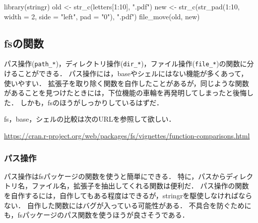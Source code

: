 \documentclass[
]{article}
\newenvironment{Shaded}{\begin{snugshade}}{\end{snugshade}}
\newcommand{\AttributeTok}[1]{\textcolor[rgb]{0.77,0.63,0.00}{#1}}
\newcommand{\DecValTok}[1]{\textcolor[rgb]{0.00,0.00,0.81}{#1}}
\newcommand{\FunctionTok}[1]{\textcolor[rgb]{0.00,0.00,0.00}{#1}}
\newcommand{\NormalTok}[1]{#1}
\newcommand{\OtherTok}[1]{\textcolor[rgb]{0.56,0.35,0.01}{#1}}
\newcommand{\SpecialCharTok}[1]{\textcolor[rgb]{0.00,0.00,0.00}{#1}}
\newcommand{\StringTok}[1]{\textcolor[rgb]{0.31,0.60,0.02}{#1}}
\begin{document}
\begin{Shaded}
\begin{Highlighting}[]
\FunctionTok{library}\NormalTok{(stringr)}
\NormalTok{old }\OtherTok{\textless{}{-}} \FunctionTok{str\_c}\NormalTok{(letters[}\DecValTok{1}\SpecialCharTok{:}\DecValTok{10}\NormalTok{], }\StringTok{".pdf"}\NormalTok{)}
\NormalTok{new }\OtherTok{\textless{}{-}} \FunctionTok{str\_c}\NormalTok{(}\FunctionTok{str\_pad}\NormalTok{(}\DecValTok{1}\SpecialCharTok{:}\DecValTok{10}\NormalTok{, }\AttributeTok{width =} \DecValTok{2}\NormalTok{, }\AttributeTok{side =} \StringTok{"left"}\NormalTok{, }\AttributeTok{pad =} \StringTok{"0"}\NormalTok{), }\StringTok{".pdf"}\NormalTok{)}
\FunctionTok{file\_move}\NormalTok{(old, new)}
\end{Highlighting}
\end{Shaded}

\hypertarget{fsux306eux95a2ux6570}{%
\subsection{fsの関数}\label{fsux306eux95a2ux6570}}

パス操作(\texttt{path\_*})，ディレクトリ操作(\texttt{dir\_*})，ファイル操作(\texttt{file\_*})の関数に分けることができる．
パス操作には，baseやシェルにはない機能が多くあって，使いやすい．
拡張子を取り除く関数を自作したことがあるが，同じような関数があることを見つけたときには，下位機能の車輪を再発明してしまったと後悔した．
しかも，fsのほうがしっかりしているはずだ．

fs，base，シェルの比較は次のURLを参照して欲しい．

\url{https://cran.r-project.org/web/packages/fs/vignettes/function-comparisons.html}

\hypertarget{ux30d1ux30b9ux64cdux4f5c}{%
\subsubsection{パス操作}\label{ux30d1ux30b9ux64cdux4f5c}}

パス操作はfsパッケージの関数を使うと簡単にできる．
特に，パスからディレクトリ名，ファイル名，拡張子を抽出してくれる関数は便利だ．
パス操作の関数を自作するには，自作してもある程度はできるが，stringrを駆使しなければならない．
自作した関数にはバグが入っている可能性がある．
不具合を防ぐためにも，fsパッケージのパス関数を使うほうが良さそうである．
\end{document}
